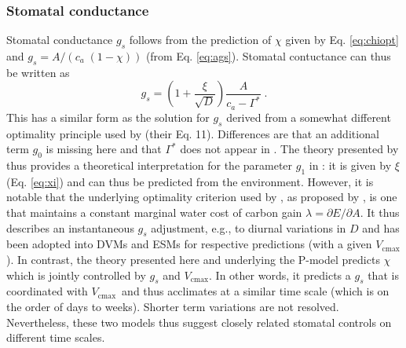 \documentclass{myreport}
\newcommand{\vcmax}{$V_{\text{cmax}}$}
\begin{document}
\subsubsection{Stomatal conductance}
Stomatal conductance $g_s$ follows from the prediction of $\chi$ given by Eq. \ref{eq:chiopt} and $g_s = A / ( c_a\;(1-\chi) )$ (from Eq. \ref{eq:ags}). Stomatal contuctance can thus be written as
\begin{equation}
    g_s = \left( 1 + \frac{\xi}{\sqrt{D}} \right) \frac{A}{c_a - \Gamma^\ast}\;.
\end{equation}
This has a similar form as the solution for $g_s$ derived from a somewhat different optimality principle used by \cite{medlyn11gcb} (their Eq. 11). Differences are that an additional term $g_0$ is missing here and that $\Gamma^\ast$ does not appear in \cite{medlyn11gcb}. The theory presented by \cite{prentice14ecollett} thus provides a theoretical interpretation for the parameter $g_1$ in \cite{medlyn11gcb}: it is given by $\xi$ (Eq. \ref{eq:xi}) and can thus be predicted from the environment. However, it is notable that the underlying optimality criterion used by \cite{medlyn11gcb}, as proposed by \cite{Cowan1977-ud}, is one that maintains a constant marginal water cost of carbon gain $\lambda = \partial E / \partial A$. It thus describes an instantaneous $g_s$ adjustment, e.g., to diurnal variations in $D$ and has been adopted into DVMs and ESMs for respective predictions (with a given \vcmax ). In contrast, the theory presented here and underlying the P-model predicts $\chi$ which is jointly controlled by $g_s$ and \vcmax . In other words, it predicts a $g_s$ that is coordinated with \vcmax\ and thus acclimates at a similar time scale (which is on the order of days to weeks). Shorter term variations are not resolved. Nevertheless, these two models thus suggest closely related stomatal controls on different time scales.

\end{document}
